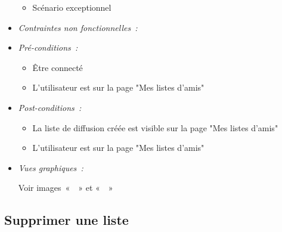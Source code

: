 \begin{itemize}
\begin{itemize}
    \item Scénario exceptionnel
\end{itemize}
\item \textit{Contraintes non fonctionnelles~:}

\item \textit{Pré-conditions~:}

    \begin{itemize}
        \item Être connecté
        \item L'utilisateur est sur la page "Mes listes d'amis"
    \end{itemize}

\item \textit{Post-conditions~:}
    \begin{itemize}
        \item La liste de diffusion créée est visible sur la page "Mes listes d'amis"
        \item L'utilisateur est sur la page "Mes listes d'amis"
\end{itemize}

\item \textit{Vues graphiques~:}

Voir images~«~~» et 
«~~»

\end{itemize}

\subsection{Supprimer une liste}\label{subsec:supprimer-une-liste}

